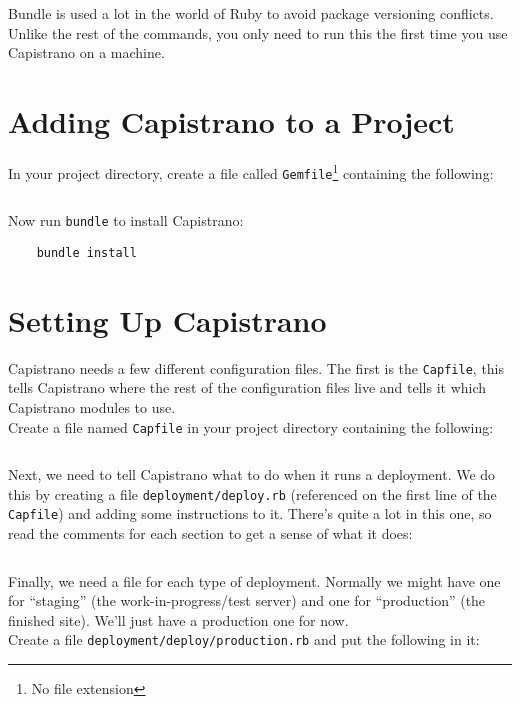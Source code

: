 Bundle is used a lot in the world of Ruby to avoid package versioning conflicts. Unlike the rest of the commands, you only need to run this the first time you use Capistrano on a machine.


\section{Adding Capistrano to a Project}

In your project directory, create a file called \texttt{Gemfile}\footnote{No file extension} containing the following:

\inputminted{ruby}{04/resources/02/01-Gemfile}

Now run \texttt{bundle} to install Capistrano:

\begin{verbatim}
    bundle install
\end{verbatim}


\section{Setting Up Capistrano}

Capistrano needs a few different configuration files. The first is the \texttt{Capfile}, this tells Capistrano where the rest of the configuration files live and tells it which Capistrano modules to use.
\\

Create a file named \texttt{Capfile} in your project directory containing the following:

\inputminted{ruby}{04/resources/02/02-Capfile}

Next, we need to tell Capistrano what to do when it runs a deployment. We do this by creating a file \texttt{deployment/deploy.rb} (referenced on the first line of the \texttt{Capfile}) and adding some instructions to it. There's quite a lot in this one, so read the comments for each section to get a sense of what it does:

\inputminted{ruby}{04/resources/02/03-deploy.rb}


Finally, we need a file for each type of deployment. Normally we might have one for ``staging'' (the work-in-progress/test server) and one for ``production'' (the finished site). We'll just have a production one for now.
\\

Create a file \texttt{deployment/deploy/production.rb} and put the following in it:

